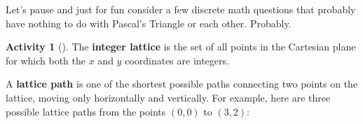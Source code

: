 \documentclass[10pt,]{book}
\newcommand{\terminology}[1]{\textbf{#1}}
\theoremstyle{plain}
\theoremstyle{definition}
\theoremstyle{definition}
\theoremstyle{definition}
\newtheorem{activity}[project]{Activity}
\numberwithin{equation}{chapter}
\newlength{\panelmax}
\begin{document}
\par
\hypertarget{p-482}{}%
Let's pause and just for fun consider a few discrete math questions that probably have nothing to do with Pascal's Triangle or each other.  Probably.%
\begin{activity}[]\label{act-latticepaths}
\hypertarget{p-483}{}%
The \terminology{integer lattice} is the set of all points in the Cartesian plane for which both the \(x\) and \(y\) coordinates are integers.%
\par
\hypertarget{p-484}{}%
A \terminology{lattice path} is one of the shortest possible paths connecting two points on the lattice, moving only horizontally and vertically. For example, here are three possible lattice paths from the points \((0,0)\) to \((3,2)\):%
{%
\setlength{\panelmax}{0pt}
\ifdefined\panelboxAimage\else\newsavebox{\panelboxAimage}\fi%
\begin{lrbox}{\panelboxAimage}
\end{lrbox}
\ifdefined\phAimage\else\newlength{\phAimage}\fi%
\setlength{\phAimage}{\ht\panelboxAimage+\dp\panelboxAimage}
\settototalheight{\phAimage}{\usebox{\panelboxAimage}}
\setlength{\panelmax}{\maxof{\panelmax}{\phAimage}}
\ifdefined\panelboxBimage\else\newsavebox{\panelboxBimage}\fi%
\begin{lrbox}{\panelboxBimage}
\end{lrbox}
\ifdefined\phBimage\else\newlength{\phBimage}\fi%
\setlength{\phBimage}{\ht\panelboxBimage+\dp\panelboxBimage}
\settototalheight{\phBimage}{\usebox{\panelboxBimage}}
\setlength{\panelmax}{\maxof{\panelmax}{\phBimage}}
}
\end{activity}
\end{document}
